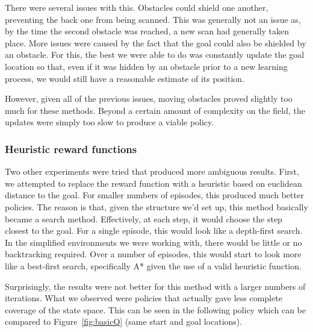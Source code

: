 \documentclass{aiaa-tc}%
\begin{document}
There were several issues with this. Obstacles could shield one
another, preventing the back one from being scanned. This was
generally not an issue as, by the time the second obstacle was
reached, a new scan had generally taken place. More issues were caused
by the fact that the goal could also be shielded by an
obstacle. For this, the best we were able to do was constantly update
the goal location so that, even if it was hidden by an obstacle prior
to a new learning process, we would still have a reasonable estimate
of its position.

However, given all of the previous issues, moving obstacles proved
slightly too much for these methods. Beyond a certain amount of
complexity on the field, the updates were simply too slow to produce a
viable policy.

\subsubsection{Heuristic reward functions}

Two other experiments were tried that produced more ambiguous
results. First, we attempted to replace the reward function with a
heuristic based on euclidean distance to the goal. For smaller numbers
of episodes, this produced much better policies. The reason is that,
given the structure we'd set up, this method basically became a
search method. Effectively, at each step, it
would choose the step closest to the goal. For a single episode,
this would look like a depth-first search. In the simplified
environments we were working with, there would be little or no
backtracking required. Over a number of episodes, this would start to
look more like a best-first search, specifically A* given the use of a
valid heuristic function.

Surprisingly, the results were not better for this method with a larger
numbers of iterations. What we observed were policies that actually
gave less complete coverage of the state space. This can be seen in
the following policy which can be compared to Figure~\ref{fig:basicQ} (same
start and goal locations).

\vspace{.3in}
\end{document}
